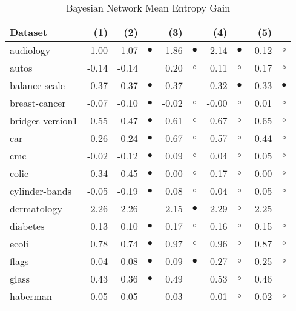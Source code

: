 \newpage
{\centering \footnotesize \begin{longtable}{lrr@{\hspace{0.1cm}}cr@{\hspace{0.1cm}}cr@{\hspace{0.1cm}}cr@{\hspace{0.1cm}}c}
\caption{\label{bnmeg}Bayesian Network Mean Entropy Gain}
\\
\hline
Dataset & (1)& (2) & & (3) & & (4) & & (5) & \\
\hline
audiology & -1.00 & -1.07 & $\bullet$ & -1.86 & $\bullet$ & -2.14 & $\bullet$ & -0.12 &   $\circ$\\
autos & -0.14 & -0.14 &           &  0.20 &   $\circ$ &  0.11 &   $\circ$ &  0.17 &   $\circ$\\
balance-scale &  0.37 &  0.37 & $\bullet$ &  0.37 &           &  0.32 & $\bullet$ &  0.33 & $\bullet$\\
breast-cancer & -0.07 & -0.10 & $\bullet$ & -0.02 &   $\circ$ & -0.00 &   $\circ$ &  0.01 &   $\circ$\\
bridges-version1 &  0.55 &  0.47 & $\bullet$ &  0.61 &   $\circ$ &  0.67 &   $\circ$ &  0.65 &   $\circ$\\
car &  0.26 &  0.24 & $\bullet$ &  0.67 &   $\circ$ &  0.57 &   $\circ$ &  0.44 &   $\circ$\\
cmc & -0.02 & -0.12 & $\bullet$ &  0.09 &   $\circ$ &  0.04 &   $\circ$ &  0.05 &   $\circ$\\
colic & -0.34 & -0.45 & $\bullet$ &  0.00 &   $\circ$ & -0.17 &   $\circ$ &  0.00 &   $\circ$\\
cylinder-bands & -0.05 & -0.19 & $\bullet$ &  0.08 &   $\circ$ &  0.04 &   $\circ$ &  0.05 &   $\circ$\\
dermatology &  2.26 &  2.26 &           &  2.15 & $\bullet$ &  2.29 &   $\circ$ &  2.25 &          \\
diabetes &  0.13 &  0.10 & $\bullet$ &  0.17 &   $\circ$ &  0.16 &   $\circ$ &  0.15 &   $\circ$\\
ecoli &  0.78 &  0.74 & $\bullet$ &  0.97 &   $\circ$ &  0.96 &   $\circ$ &  0.87 &   $\circ$\\
flags &  0.04 & -0.08 & $\bullet$ & -0.09 & $\bullet$ &  0.27 &   $\circ$ &  0.25 &   $\circ$\\
glass &  0.43 &  0.36 & $\bullet$ &  0.49 &           &  0.53 &   $\circ$ &  0.46 &          \\
haberman & -0.05 & -0.05 &           & -0.03 &           & -0.01 &   $\circ$ & -0.02 &   $\circ$\\

\end{longtable}}
